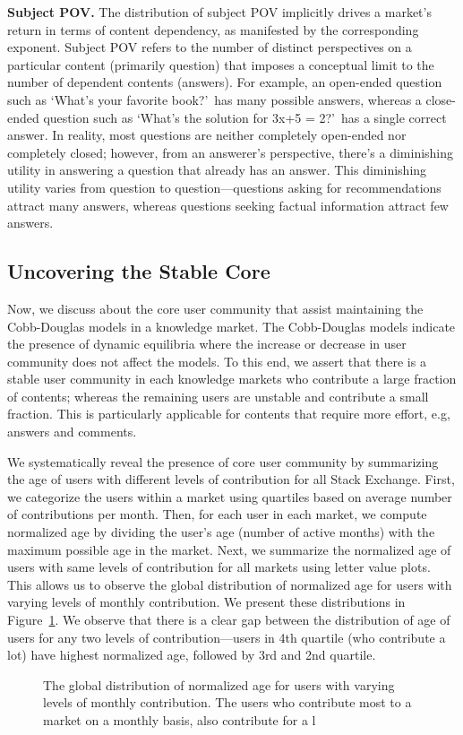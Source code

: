\textbf{Subject POV.} The distribution of subject POV implicitly drives a market's return in terms of content dependency, as manifested by the corresponding exponent. Subject POV refers to the number of distinct perspectives on a particular content (primarily question) that imposes a conceptual limit to the number of dependent contents (answers). For example, an open-ended question such as \lq What's your favorite book?\rq\ has many possible answers, whereas a close-ended question such as \lq What's the solution for 3x+5 = 2?\rq\ has a single correct answer. In reality, most questions are neither completely open-ended nor completely closed; however, from an answerer's perspective, there's a diminishing utility in answering a question that already has an answer. This diminishing utility varies from question to question---questions asking for recommendations attract many answers, whereas questions seeking factual information attract few answers. 

\subsection{Uncovering the Stable Core} 
Now, we discuss about the core user community that assist maintaining the Cobb-Douglas models in a knowledge market. The Cobb-Douglas models indicate the presence of dynamic equilibria where the increase or decrease in user community does not affect the models. To this end, we assert that there is a stable user community in each knowledge markets who contribute a large fraction of contents; whereas the remaining users are unstable and contribute a small fraction. This is particularly applicable for contents that require more effort, e.g, answers and comments. 

We systematically reveal the presence of core user community by summarizing the age of users with different levels of contribution for all Stack Exchange. First, we categorize the users within a market using quartiles based on average number of contributions per month. Then, for each user in each market, we compute normalized age by dividing the user's age (number of active months) with the maximum possible age in the market. Next, we summarize the normalized age of users with same levels of contribution for all markets using letter value plots. This allows us to observe the global distribution of normalized age for users with varying levels of monthly contribution. We present these distributions in Figure~\ref{fig:age_vs_contribution}. We observe that there is a clear gap between the distribution of age of users for any two levels of contribution---users in 4th quartile (who contribute a lot) have highest normalized age, followed by 3rd and 2nd quartile. 

\begin{figure}[hbt]
\centering
\caption{The global distribution of normalized age for users with varying levels of monthly contribution. The users who contribute most to a market on a monthly basis, also contribute for a l}
\label{fig:age_vs_contribution}
\end{figure}



